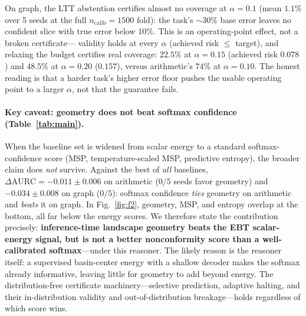 On graph, the LTT abstention certifies almost no coverage at $\alpha{=}0.1$ (mean $1.1\%$ over 5
seeds at the full $n_\text{calib}=1500$ fold): the task's ${\sim}30\%$ base error leaves no confident
slice with true error below $10\%$. This is an operating-point effect, not a broken certificate---%
validity holds at every $\alpha$ (achieved risk $\le$ target), and relaxing the budget certifies real
coverage: $22.5\%$ at $\alpha{=}0.15$ (achieved risk $0.078$) and $48.5\%$ at $\alpha{=}0.20$
($0.157$), versus arithmetic's $74\%$ at $\alpha{=}0.10$. The honest reading is that a harder task's
higher error floor pushes the usable operating point to a larger $\alpha$, not that the guarantee
fails.

\paragraph{Key caveat: geometry does not beat softmax confidence (Table~\ref{tab:main}).} When the
baseline set is widened from scalar energy to a standard softmax-confidence score (MSP,
temperature-scaled MSP, predictive entropy), the broader claim does \emph{not} survive. Against the
best of \emph{all} baselines, $\Delta\mathrm{AURC} = -0.011\pm0.006$ on arithmetic ($0/5$ seeds
favor geometry) and $-0.034\pm0.008$ on graph ($0/5$): softmax confidence \emph{ties} geometry on
arithmetic and \emph{beats} it on graph. In Fig.~\ref{fig:f2}, geometry, MSP, and entropy overlap at
the bottom, all far below the energy scores. We therefore state the contribution precisely:
\textbf{inference-time landscape geometry beats the EBT scalar-energy signal, but is not a better
nonconformity score than a well-calibrated softmax}---under this reasoner. The likely reason is the
reasoner itself: a supervised basin-center energy with a shallow decoder makes the softmax already
informative, leaving little for geometry to add beyond energy. The distribution-free certificate
machinery---selective prediction, adaptive halting, and their in-distribution validity and
out-of-distribution breakage---holds regardless of which score wins.

